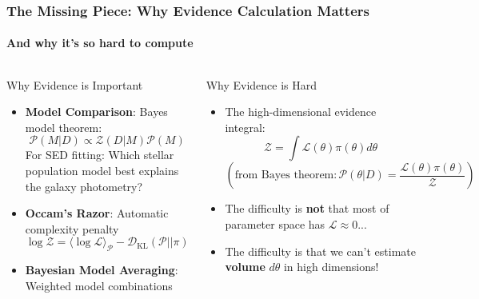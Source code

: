 \documentclass[aspectratio=169]{beamer}
\begin{document}
\begin{frame}
    \frametitle{The Missing Piece: Why Evidence Calculation Matters}
    \framesubtitle{And why it's so hard to compute}
    \begin{columns}[T]
        \begin{block}{Why Evidence is Important}
            \begin{itemize}
                \item \textbf{Model Comparison}: Bayes model theorem:
            \[\mathcal{P}(M|D) \propto \mathcal{Z}(D|M) \mathcal{P}(M)\]
            For SED fitting: Which stellar population model best explains the galaxy photometry?
        \item  \textbf{Occam's Razor}: Automatic complexity penalty
            \[\log \mathcal{Z} = \langle \log \mathcal{L} \rangle_{\mathcal{P}} - \mathcal{D}_{\text{KL}}(\mathcal{P}||\pi)\]
        \item \textbf{Bayesian Model Averaging}: Weighted model combinations
            \end{itemize}
        \end{block}
        \begin{block}{Why Evidence is Hard}
            \begin{itemize}
                \item The high-dimensional evidence integral:
            \[\mathcal{Z} = \int \mathcal{L}(\theta) \pi(\theta) d\theta\]
            \[\left(\text{from Bayes theorem}:\mathcal{P}(\theta|D) = \frac{\mathcal{L}(\theta) \pi(\theta)}{\mathcal{Z}}\right)\]
            \pause
        \item The difficulty is \textbf{not} that most of parameter space has $\mathcal{L} \approx 0$...
            \pause
        \item The difficulty is that we can't estimate \textbf{volume} $d\theta$ in high dimensions!
            \end{itemize}
        \end{block}
    \end{columns}
\end{frame}
\end{document}
